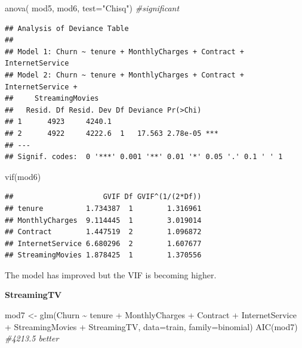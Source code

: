 \documentclass[
  twoside]{article}
\newenvironment{Shaded}{\begin{snugshade}}{\end{snugshade}}
\newcommand{\AttributeTok}[1]{\textcolor[rgb]{0.77,0.63,0.00}{#1}}
\newcommand{\CommentTok}[1]{\textcolor[rgb]{0.56,0.35,0.01}{\textit{#1}}}
\newcommand{\FunctionTok}[1]{\textcolor[rgb]{0.00,0.00,0.00}{#1}}
\newcommand{\NormalTok}[1]{#1}
\newcommand{\OtherTok}[1]{\textcolor[rgb]{0.56,0.35,0.01}{#1}}
\newcommand{\SpecialCharTok}[1]{\textcolor[rgb]{0.00,0.00,0.00}{#1}}
\newcommand{\StringTok}[1]{\textcolor[rgb]{0.31,0.60,0.02}{#1}}
\begin{document}
\begin{Shaded}
\begin{Highlighting}[]
\FunctionTok{anova}\NormalTok{( mod5, mod6,  }\AttributeTok{test=}\StringTok{"Chisq"}\NormalTok{) }\CommentTok{\#significant}
\end{Highlighting}
\end{Shaded}

\begin{verbatim}
## Analysis of Deviance Table
## 
## Model 1: Churn ~ tenure + MonthlyCharges + Contract + InternetService
## Model 2: Churn ~ tenure + MonthlyCharges + Contract + InternetService + 
##     StreamingMovies
##   Resid. Df Resid. Dev Df Deviance Pr(>Chi)    
## 1      4923     4240.1                         
## 2      4922     4222.6  1   17.563 2.78e-05 ***
## ---
## Signif. codes:  0 '***' 0.001 '**' 0.01 '*' 0.05 '.' 0.1 ' ' 1
\end{verbatim}

\begin{Shaded}
\begin{Highlighting}[]
\FunctionTok{vif}\NormalTok{(mod6)}
\end{Highlighting}
\end{Shaded}

\begin{verbatim}
##                     GVIF Df GVIF^(1/(2*Df))
## tenure          1.734387  1        1.316961
## MonthlyCharges  9.114445  1        3.019014
## Contract        1.447519  2        1.096872
## InternetService 6.680296  2        1.607677
## StreamingMovies 1.878425  1        1.370556
\end{verbatim}

The model has improved but the VIF is becoming higher.

\textbf{StreamingTV}

\begin{Shaded}
\begin{Highlighting}[]
\NormalTok{mod7 }\OtherTok{\textless{}{-}} \FunctionTok{glm}\NormalTok{(Churn }\SpecialCharTok{\textasciitilde{}}\NormalTok{ tenure }\SpecialCharTok{+}\NormalTok{ MonthlyCharges }\SpecialCharTok{+}\NormalTok{ Contract }\SpecialCharTok{+}\NormalTok{ InternetService }\SpecialCharTok{+} 
\NormalTok{              StreamingMovies }\SpecialCharTok{+}\NormalTok{ StreamingTV, }\AttributeTok{data=}\NormalTok{train, }\AttributeTok{family=}\NormalTok{binomial)}
\FunctionTok{AIC}\NormalTok{(mod7) }\CommentTok{\#4213.5 better}
\end{Highlighting}
\end{Shaded}
\end{document}
